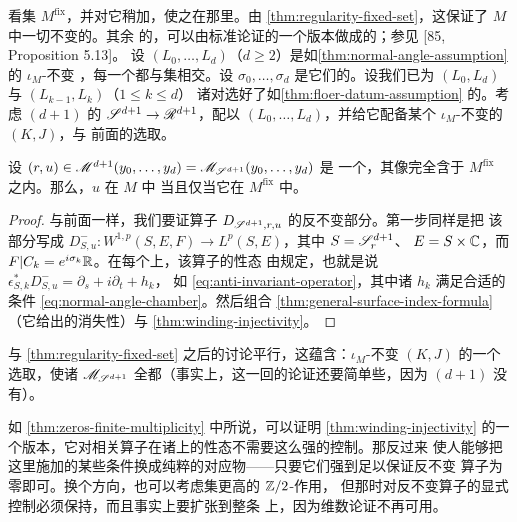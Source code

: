 看\trFixedPoint{}集 $M^{\mathrm{fix}}$，并对它稍加\trPerturbation{}，使之在那里\trRegular{}。由
\cref{thm:regularity-fixed-set}，这保证了 $M$ 中一切不变\trFloer{}\trTrajectory{}的\trRegularity{}。其余
的\trTrajectory{}，可以由标准\trTransversality{}论证的一个版本做成\trRegular{}的；参见 [85, Proposition 5.13]。
设 $(L_0,\ldots,L_d)$（$d\ge 2$）是如\cref{thm:normal-angle-assumption} 的 $\iota_M$-不变%
\trExact\trLagrange\trSubmanifold，每一个都与\trFixedPoint{}集相交。设 $\sigma_0,\ldots,\sigma_d$
是它们的\trNormalAngle。设我们已为 $(L_0,L_d)$ 与 $(L_{k-1},L_k)$（$1\le k\le d$）
诸对选好了如\cref{thm:floer-datum-assumption} 的\trFloerDatum。考虑 $(d{+}1)$ \trPointedDisc{}
的\trUniversal\trFamily{} $\mathscr{S}^{d+1}\to\mathscr{R}^{d+1}$，配以\trLagrange\trLabel{}
$(L_0,\ldots,L_d)$，并给它配备某个 $\iota_M$-不变的\trPerturbationDatum{} $(K,J)$，与
前面\trFloerDatum{}的选取\trCompatible。
\begin{lemma}\label{thm:regularity-polygons}
设 $(r,u)\in\mathscr{M}^{d+1}(y_0,\ldots,y_d)=\mathscr{M}_{\mathscr{S}^{d+1}}(y_0,\ldots,y_d)$ 是
一个\trInhomogeneous{}\trPseudoholomorphic\trPolygon，其像完全含于 $M^{\mathrm{fix}}$ 之内。那么，$u$ 在 $M$ 中%
\trRegular{}当且仅当它在 $M^{\mathrm{fix}}$ 中\trRegular{}。
\end{lemma}
\begin{proof}
与前面一样，我们要证算子 $D_{\mathscr{S}^{d+1},r,u}$ 的反不变部分\trInvertible{}。第一步同样是把
该部分写成 $D^-_{S,u}\colon W^{1,p}(S,E,F)\to L^p(S,E)$，其中 $S=\mathscr{S}^{d+1}_r$、
$E=S\times\mathbb{C}$，而 $F|C_k=e^{i\sigma_k}\mathbb{R}$。在每个\trStriplikeEnd{}上，该算子的性态
由\trFloerDatum{}规定，也就是说 $\epsilon^*_{S,k}D^-_{S,u}=\partial_s+i\partial_t+h_k$，
如 \eqref{eq:anti-invariant-operator}，其中诸 $h_k$ 满足合适的条件
\eqref{eq:normal-angle-chamber}。然后组合 \cref{thm:general-surface-index-formula}
（它给出\trIndex{}的消失性）与 \cref{thm:winding-injectivity}。
\end{proof}
与 \cref{thm:regularity-fixed-set} 之后的讨论平行，这蕴含：$\iota_M$-不变%
\trPerturbationDatum{} $(K,J)$ 的一个\trGeneric{}选取，使诸\trModuliSpace{}
$\mathscr{M}_{\mathscr{S}^{d+1}}$ 全都\trRegular{}（事实上，这一回的论证还要简单些，因为 $(d{+}1)$
\trPointedDisc{}没有\trAutomorphism）。
\begin{remark}\label{thm:weaker-assumptions-remark}
如 \cref{thm:zeros-finite-multiplicity} 中所说，可以证明 \cref{thm:winding-injectivity}
的一个版本，它对相关算子在诸\trStriplikeEnd{}上的性态不需要这么强的控制。那反过来
使人能够把这里施加的某些条件换成纯粹\trTopology{}的对应物——只要它们强到足以保证反不变%
\trLinearization{}算子\trIndex{}为零即可。换个方向，也可以考虑\trFixedPoint{}集\trCodimension{}更高的 $\mathbb{Z}/2$-作用，
但那时对反不变算子的显式控制必须保持，而且事实上要扩张到整条\trRiemann\trSurface{}
上，因为维数论证不再可用。
\end{remark}
